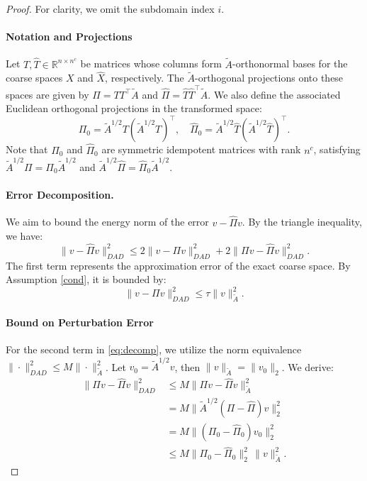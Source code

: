 \documentclass{article}
\theoremstyle{definition}
\theoremstyle{remark}
\begin{document}
\begin{proof}
    For clarity, we omit the subdomain index $i$. 
    
    \paragraph{Notation and Projections}
    Let $T, \hat{T} \in \mathbb{R}^{n \times n^c}$ be matrices whose columns form $\tilde{A}$-orthonormal bases for the coarse spaces $X$ and $\hat{X}$, respectively. The $\tilde{A}$-orthogonal projections onto these spaces are given by $\Pi = T T^\top \tilde{A}$ and $\hat{\Pi} = \hat{T} \hat{T}^\top \tilde{A}$.
    We also define the associated Euclidean orthogonal projections in the transformed space:
    \[
        \Pi_0 = \tilde{A}^{1/2} T (\tilde{A}^{1/2} T)^\top, \quad \hat{\Pi}_0 = \tilde{A}^{1/2} \hat{T} (\tilde{A}^{1/2} \hat{T})^\top.
    \]
    Note that $\Pi_0$ and $\hat{\Pi}_0$ are symmetric idempotent matrices with rank $n^c$, satisfying $\tilde{A}^{1/2} \Pi = \Pi_0 \tilde{A}^{1/2}$ and $\tilde{A}^{1/2} \hat{\Pi} = \hat{\Pi}_0 \tilde{A}^{1/2}$.

    \paragraph{Error Decomposition.}
    We aim to bound the energy norm of the error $v - \hat{\Pi}v$. 
    By the triangle inequality, we have:
    \begin{equation}\label{eq:decomp}
        \|v - \hat{\Pi}v\|_{D A D}^2 \leq 2 \|v - \Pi v\|_{D A D}^2 + 2 \|\Pi v - \hat{\Pi}v\|_{D A D}^2.
    \end{equation}
    The first term represents the approximation error of the exact coarse space. By Assumption \cref{cond}, it is bounded by:
    \begin{equation}\label{eq:term1}
        \|v - \Pi v\|_{D A D}^2 \leq \tau \|v\|_{\tilde{A}}^2.
    \end{equation}

    \paragraph{Bound on Perturbation Error}
    For the second term in \cref{eq:decomp}, we utilize the norm equivalence $\| \cdot \|_{D A D}^2 \leq M \| \cdot \|_{\tilde{A}}^2$. Let $v_0 = \tilde{A}^{1/2} v$, then $\|v\|_{\tilde{A}} = \|v_0\|_2$. We derive:
    \begin{equation}\label{eq:term2_pre}
    \begin{aligned}
        \|\Pi v - \hat{\Pi}v\|_{D A D}^2 
        &\leq M \|\Pi v - \hat{\Pi}v\|_{\tilde{A}}^2 \\
        &= M \| \tilde{A}^{1/2} (\Pi - \hat{\Pi}) v \|_2^2 \\
        &= M \| (\Pi_0 - \hat{\Pi}_0) v_0 \|_2^2 \\
        &\leq M \|\Pi_0 - \hat{\Pi}_0\|_2^2 \, \|v\|_{\tilde{A}}^2.
    \end{aligned}
    \end{equation}
    

\end{proof}
\end{document}
